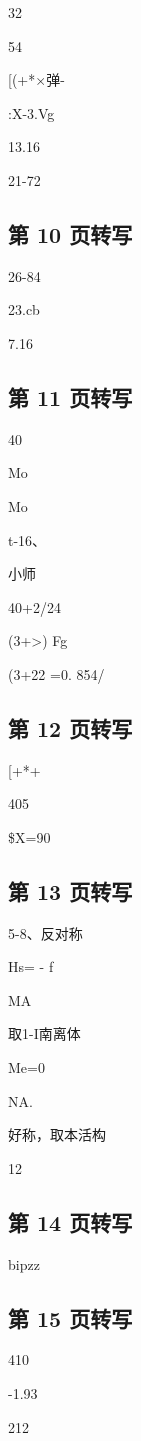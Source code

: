 32

54

[(+*$\times$弹-

:X-3.Vg

13.16

21-72

\subsection*{第 10 页转写}
26-84

23.cb

7.16

\subsection*{第 11 页转写}
40

Mo

Mo

t-16、

小师

40+2/24

(3+>) Fg

(3+22 =0. 854/

\subsection*{第 12 页转写}
[+*+

405

\$X=90

\subsection*{第 13 页转写}
5-8、反对称

Hs= - f

MA

取1-I南离体

Me=0

NA.

好称，取本活构

12

\subsection*{第 14 页转写}
bipzz

\subsection*{第 15 页转写}
410

-1.93

212

